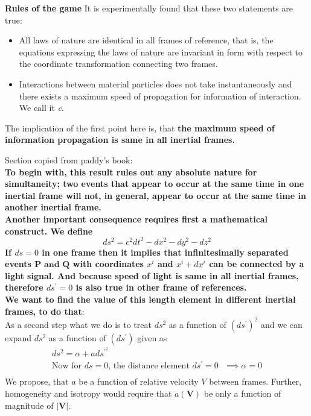 \documentclass[12pt]{report}
\newcommand{\mbf}[1]{\mathbf{#1}}
\newcommand{\tbf}[1]{\textbf{#1}}
\newcommand{\tit}[1]{\textit{#1}}
\begin{document}
\textbf{Rules of the game}
It is experimentally found that these two statements are true:
\begin{itemize}
\item All laws of nature are identical in all frames of reference, that is, the equations expressing the laws of nature are invariant in form with respect to the coordinate transformation connecting two frames.
\item Interactions between material particles does not take instantaneously and there exists a maximum speed of propagation for information of interaction. We call it \tit{c}.
\end{itemize}

The implication of the first point here is, that \tbf{the maximum speed of information propagation is same in all inertial frames.}



Section copied from paddy's book:\\
\textbf{To begin with, this result rules out any absolute nature for simultaneity; two events that appear to occur at the same time in one inertial frame will not, in general, appear to occur at the same time in another inertial frame.}\\
\textbf{Another important consequence requires first a mathematical construct. We define
\begin{equation}
ds^2=c^2dt^2 - dx^2 - dy^2 - dz^2
\end{equation}
If $ds=0$ in one frame then it implies that infinitesimally separated events $\mbf{P\text{ and } Q}$ with coordinates $x^i$ and $x^i+dx^i$ can be connected by a light signal. And because speed of light is same in all inertial frames, therefore $ds^\prime=0$ is also true in other frame of references. }
\\
\textbf{We want to find the value of this length element in different inertial frames, to do that}:\\
As a second step what we do is to treat $ds^2$ as a function of $(ds^\prime)^2$ and we can expand $ds^2$ as a function of $(ds^\prime)$ given as
\begin{eqnarray*}
ds^2=\alpha + a ds^{\prime^2}\\
\text{Now for $ds=0$, the distance element  $ds^\prime=0$ } \implies \alpha=0\\
\end{eqnarray*}  
We propose, that $a$ be a function of relative velocity $V$ between frames. Further, homogeneity and isotropy would require that $a(\mbf{V})$ be only a function of magnitude of $|\mbf{V}|$.
\end{document}
